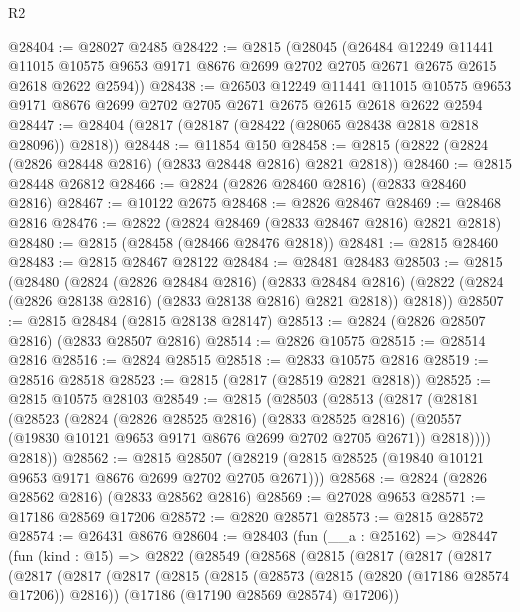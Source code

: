 \begin{lexlean}{R2}
\begin{coremodule}
@28404 := @28027 @2485
@28422 := @2815
    (@28045
      (@26484
        @12249
        @11441
        @11015
        @10575
        @9653
        @9171
        @8676
        @2699
        @2702
        @2705
        @2671
        @2675
        @2615
        @2618
        @2622
        @2594))
@28438 := @26503
    @12249
    @11441
    @11015
    @10575
    @9653
    @9171
    @8676
    @2699
    @2702
    @2705
    @2671
    @2675
    @2615
    @2618
    @2622
    @2594
@28447 := @28404 (@2817 (@28187 (@28422 (@28065 @28438 @2818 @2818 @28096)) @2818))
@28448 := @11854 @150
@28458 := @2815 (@2822 (@2824 (@2826 @28448 @2816) (@2833 @28448 @2816) @2821 @2818))
@28460 := @2815 @28448 @26812
@28466 := @2824 (@2826 @28460 @2816) (@2833 @28460 @2816)
@28467 := @10122 @2675
@28468 := @2826 @28467
@28469 := @28468 @2816
@28476 := @2822 (@2824 @28469 (@2833 @28467 @2816) @2821 @2818)
@28480 := @2815 (@28458 (@28466 @28476 @2818))
@28481 := @2815 @28460
@28483 := @2815 @28467 @28122
@28484 := @28481 @28483
@28503 := @2815
    (@28480
      (@2824
        (@2826 @28484 @2816)
        (@2833 @28484 @2816)
        (@2822 (@2824 (@2826 @28138 @2816) (@2833 @28138 @2816) @2821 @2818))
        @2818))
@28507 := @2815 @28484 (@2815 @28138 @28147)
@28513 := @2824 (@2826 @28507 @2816) (@2833 @28507 @2816)
@28514 := @2826 @10575
@28515 := @28514 @2816
@28516 := @2824 @28515
@28518 := @2833 @10575 @2816
@28519 := @28516 @28518
@28523 := @2815 (@2817 (@28519 @2821 @2818))
@28525 := @2815 @10575 @28103
@28549 := @2815
    (@28503
      (@28513
        (@2817
          (@28181
            (@28523
              (@2824
                (@2826 @28525 @2816)
                (@2833 @28525 @2816)
                (@20557 (@19830 @10121 @9653 @9171 @8676 @2699 @2702 @2705 @2671))
                @2818))))
        @2818))
@28562 := @2815
    @28507
    (@28219 (@2815 @28525 (@19840 @10121 @9653 @9171 @8676 @2699 @2702 @2705 @2671)))
@28568 := @2824 (@2826 @28562 @2816) (@2833 @28562 @2816)
@28569 := @27028 @9653
@28571 := @17186 @28569 @17206
@28572 := @2820 @28571
@28573 := @2815 @28572
@28574 := @26431 @8676
@28604 := @28403
    (fun (__a : @25162) =>
    @28447
      (fun (kind : @15) =>
      @2822
        (@28549
          (@28568
            (@2815
              (@2817
                (@2817
                  (@2817
                    (@2817
                      (@2817
                        (@2817
                          (@2815
                            (@2815
                              (@28573 (@2815 (@2820 (@17186 @28574 @17206)) @2816))
                              (@17186 (@17190 @28569 @28574) @17206))

\end{coremodule}
\end{lexlean}
